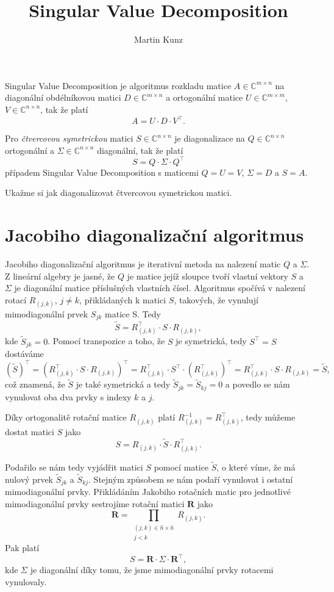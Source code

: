 \documentclass[czech]{article}
\title{Singular Value Decomposition}
\author{Martin Kunz}
\newcommand\C{\ensuremath{\mathbb{C}}}
\renewcommand\tilde\widetilde
\renewcommand\hat\widehat
\begin{document}
\maketitle
Singular Value Decomposition je algoritmus rozkladu matice $A \in \C^{m \times n}$ na diagonální obdélníkovou matici $D \in \C^{m \times n}$ a ortogonální matice $U \in \C^{m\times m}$, $V \in \C^{n \times n}$, tak že platí
\[
	A = U\cdot D\cdot V^{\top}.
\]


Pro \emph{čtvercovou symetrickou} matici $S \in \C^{n \times n}$ je diagonalizace na $Q \in \C^{n \times n}$ ortogonální a $\Sigma \in \C^{n \times n}$ diagonální, tak že platí
\[
	S = Q\cdot \Sigma \cdot Q^{\top}
\]
případem Singular Value Decomposition s maticemi $Q = U = V$, $\Sigma = D$ a $S = A$.


Ukažme si jak diagonalizovat čtvercovou symetrickou matici.
\section{Jacobiho diagonalizační algoritmus}
Jacobiho diagonalizační algoritmus je iterativní metoda na nalezení matic $Q$ a $\Sigma$. Z lineární algebry je jasné, že $Q$ je matice jejíž sloupce tvoří vlastní vektory $S$ a $\Sigma$ je diagonální matice příslušných vlastních čísel. Algoritmus spočívá v nalezení rotací $R_{(j,k)}$, $j \neq k$, přikládaných k matici $S$, takových, že vynulují mimodiagonální prvek $S_{jk}$ matice S. Tedy
\begin{equation}
	\label{eq:tvar_iterace_prvku_sjk}
	\tilde{S} = R_{(j,k)}^{\top}\cdot S \cdot R_{(j,k)},
\end{equation}
kde $ \tilde{S}_{jk} = 0$. Pomocí transpozice a toho, že $S$ je symetrická, tedy $S^{\top}= S$ dostáváme
\[
	\left(  \tilde{S} \right)^{\top} =
	\left( R_{(j,k)}^{\top}\cdot S \cdot R_{(j,k)} \right)^{\top} =
	R_{(j,k)}^{\top}\cdot S^{\top} \cdot \left(R_{(j,k)}^{\top}\right)^{\top} =
	R_{(j,k)}^{\top} \cdot S \cdot R_{(j,k)} = \tilde{S},
\]
což znamená, že $\tilde{S}$ je také symetrická a tedy $\tilde{S}_{jk} = \tilde{S}_{kj} = 0$ a povedlo se nám vynulovat oba dva prvky s indexy $k$ a $j$.


Díky ortogonalitě rotační matice $R_{(j,k)}$ platí $R_{(j,k)}^{-1} = R_{(j,k)}^{\top}$, tedy můžeme dostat matici $S$ jako
\[
	S = R_{(j,k)}\cdot\tilde{S}\cdot R_{(j,k)}^{\top}.
\]


Podařilo se nám tedy vyjádřit matici $S$ pomocí matice $\tilde{S}$, o které víme, že má nulový prvek $\tilde{S}_{jk}$ a $\tilde{S}_{kj}$. Stejným způsobem se nám podaří vynulovat i ostatní mimodiagonální prvky. Přikládáním Jakobiho rotačních matic pro jednotlivé mimodiagonální prvky sestrojíme rotační matici $\boldsymbol{R}$ jako
\[
	\boldsymbol{R} = \prod_{
		\substack{ (j,k) \in \hat{n} \times \hat{n} \\ j < k}
	}   R_{(j,k)}.
\]
Pak platí
\[
	S = \boldsymbol{R}\cdot \Sigma \cdot \boldsymbol{R}^{\top},
\]
kde $\Sigma$ je diagonální díky tomu, že jsme mimodiagonální prvky rotacemi vynulovaly.
\end{document}
